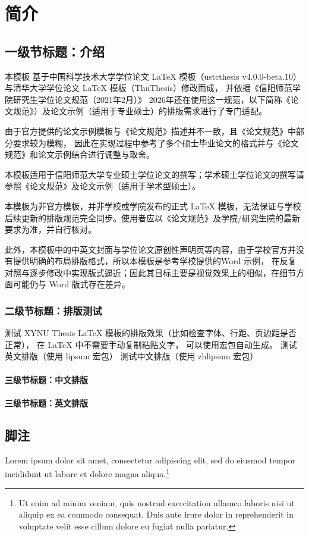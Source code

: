 
\chapter{简介}

\section{一级节标题：介绍}

本模板 基于中国科学技术大学学位论文 LaTeX 模板（ustcthesis v4.0.0-beta.10）与清华大学学位论文 LaTeX 模板（ThuThesis）修改而成，
并依据《信阳师范学院研究生学位论文规范（2021年2月）》
2026年还在使用这一规范，以下简称《论文规范》）及论文示例（适用于专业硕士）的排版需求进行了专门适配。


由于官方提供的论文示例模板与《论文规范》描述并不一致，且《论文规范》中部分要求较为模糊，
因此在实现过程中参考了多个硕士毕业论文的格式并与《论文规范》和论文示例结合进行调整与取舍。


本模板适用于信阳师范大学专业硕士学位论文的撰写；学术硕士学位论文的撰写请参照《论文规范》及论文示例（适用于学术型硕士）。

本模板为非官方模板，并非学校或学院发布的正式 LaTeX 模板，无法保证与学校后续更新的排版规范完全同步。使用者应以《论文规范》及学院/研究生院的最新要求为准，并自行核对。

此外，本模板中的中英文封面与学位论文原创性声明页等内容，由于学校官方并没有提供明确的布局排版格式，所以本模板是参考学校提供的Word 示例，
在反复对照与逐步修改中实现版式逼近；因此其目标主要是视觉效果上的相似，在细节方面可能仍与 Word 版式存在差异。

\subsection{二级节标题：排版测试}
测试 XYNU Thesis LaTeX 模板的排版效果（比如检查字体、行距、页边距是否正常），
在 LaTeX 中不需要手动复制粘贴文字，
可以使用宏包自动生成。
测试英文排版（使用 lipsum 宏包）
测试中文排版（使用 zhlipsum 宏包）
\subsubsection{三级节标题：中文排版}

\zhlipsum[1-2]

\subsubsection{三级节标题：英文排版}
\lipsum[1-2]

\section{脚注}

Lorem ipsum dolor sit amet, consectetur adipiscing elit, sed do eiusmod tempor
incididunt ut labore et dolore magna aliqua.\footnote{Ut enim ad minim veniam, quis nostrud exercitation ullamco laboris
  nisi ut aliquip ex ea commodo consequat.
  Duis aute irure dolor in reprehenderit in voluptate velit esse cillum dolore
  eu fugiat nulla pariatur.}
